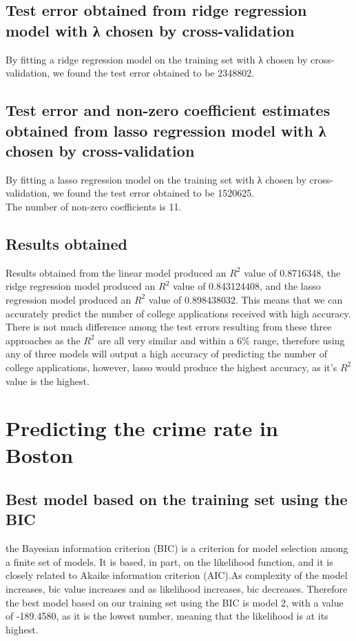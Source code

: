 \documentclass{article}
\begin{document}
\subsection{Test error obtained from ridge regression model with λ chosen by cross-validation}
By fitting a ridge regression model on the training set with λ chosen by cross-validation, we found the test error obtained to be 2348802.

\subsection{Test error and non-zero coefficient estimates obtained from lasso regression model with λ chosen by cross-validation}
By fitting a lasso regression model on the training set with λ chosen by cross-validation, we found the test error obtained to be 1520625.\\
The number of non-zero coefficients is 11.

\subsection{Results obtained}
Results obtained from the linear model produced an $R^2$ value of 0.8716348, the ridge regression model produced an $R^2$ value of 0.843124408, and the lasso regression model produced an $R^2$ value of 0.898438032. This means that we can accurately predict the number of college applications received with high accuracy. There is not much difference among the test errors resulting from these three approaches as the $R^2$ are all very similar and within a 6\% range, therefore using any of three models will output a high accuracy of predicting the number of college applications, however, lasso would produce the highest accuracy, as it's $R^2$ value is the highest.

\newpage

\section{Predicting the crime rate in Boston}

\subsection{Best model based on the training set using the BIC}

the Bayesian information criterion (BIC) is a criterion for model selection among a finite set of models. It is based, in part, on the likelihood function, and it is closely related to Akaike information criterion (AIC).As complexity of the model increases, bic value increases and as likelihood increases, bic decreases. Therefore the best model based on our training set using the BIC is model 2, with a value of -189.4580, as it is the lowest number, meaning that the likelihood is at its highest. 
\end{document}

